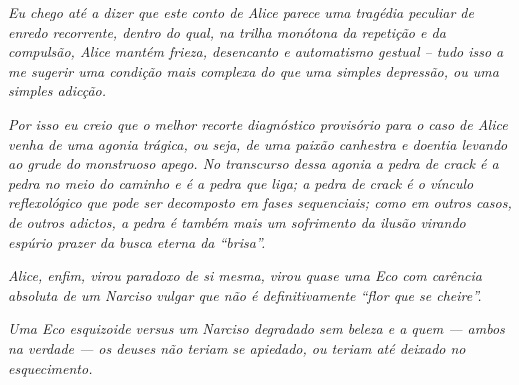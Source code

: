 \emph{Eu chego até a dizer que este conto de Alice parece uma tragédia
peculiar de enredo recorrente, dentro do qual, na trilha monótona da
repetição e da compulsão, Alice mantém frieza, desencanto e automatismo gestual -- tudo isso a me sugerir uma condição mais complexa do que
uma simples depressão, ou uma simples adicção.}

\emph{Por isso eu creio que o melhor recorte diagnóstico provisório para
o caso de Alice venha de uma agonia trágica, ou seja, de uma paixão
canhestra e doentia levando ao grude do monstruoso apego. No transcurso
dessa agonia a pedra de crack é a pedra no meio do caminho e é a pedra
que liga; a pedra de crack é o vínculo reflexológico que pode ser
decomposto em fases sequenciais; como em outros casos, de outros
adictos, a pedra é também mais um sofrimento da ilusão virando espúrio
prazer da busca eterna da ``brisa''.}~

\emph{Alice, enfim, virou paradoxo de si mesma, virou quase uma Eco com
carência absoluta de um Narciso vulgar que não é definitivamente ``flor
que se cheire''.}~

\emph{Uma Eco esquizoide versus um Narciso degradado sem beleza e a quem
--- ambos na verdade --- os deuses não teriam se apiedado, ou teriam até
deixado no esquecimento. ~}~
\endgroup